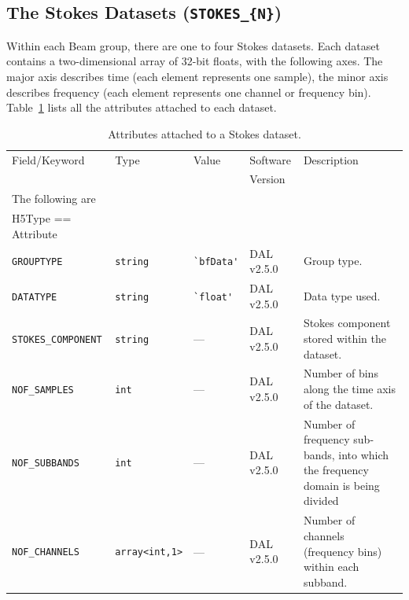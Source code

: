 \documentclass[a4paper,10pt,bibtotoc]{scrartcl}
\begin{document}
\clearpage


\subsection{The Stokes Datasets ({\tt STOKES\_\{N\}})}
\label{sec:Stokes Datasets}

Within each Beam group, there are one to four Stokes datasets. Each dataset contains a two-dimensional array of 32-bit floats, with the following axes. The major axis describes time (each element represents one sample), the minor axis describes frequency (each element represents one channel or frequency bin). Table~\ref{tab:stokes attributes} lists all the attributes attached to each dataset.

\begin{table}[htbp]
  \centering
  \begin{tabular}{|llllp{5.5cm}|}
    \hline
    \sc Field/Keyword  & \sc Type & \sc Value & \sc Software  & Description \\
    \sc   & \sc & \sc & \sc Version  & \\
    \hline \hline
    \sc The following are & \sc & \sc & \sc   &\\
    \sc H5Type == Attribute & \sc & \sc & \sc   &\\
    \hline 
    \verb|GROUPTYPE|    & \verb|string|  & \verb|`bfData'| & DAL v2.5.0 & Group type. \\
    \verb|DATATYPE |    & \verb|string|  & \verb|`float'| & DAL v2.5.0 & Data type used. \\
    \verb|STOKES_COMPONENT|  & \verb|string| & --- & DAL v2.5.0 & Stokes component stored within the dataset. \\
    \verb|NOF_SAMPLES|  & \verb|int| & --- & DAL v2.5.0 & Number of bins along the time axis of the dataset. \\
    \verb|NOF_SUBBANDS|  & \verb|int| & --- & DAL v2.5.0 & Number of frequency sub-bands, into which the frequency domain is being divided \\
    \verb|NOF_CHANNELS|  & \verb|array<int,1>| & --- & DAL v2.5.0 & Number of channels (frequency bins) within each subband. \\ 
    \hline 
  \end{tabular}
  \caption{Attributes attached to a Stokes dataset.}
  \label{tab:stokes attributes}
\end{table}
\end{document}
